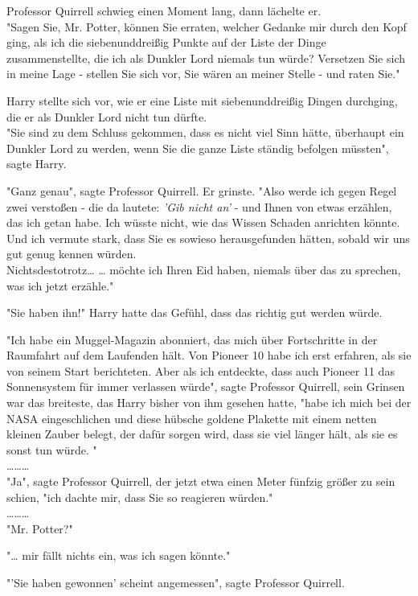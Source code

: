 {Professor Quirrell schwieg einen Moment lang, dann lächelte er.\\ "Sagen Sie, Mr. Potter, können Sie erraten, welcher Gedanke mir durch den Kopf ging, als ich die siebenunddreißig Punkte auf der Liste der Dinge zusammenstellte, die ich als Dunkler Lord niemals tun würde? Versetzen Sie sich in meine Lage - stellen Sie sich vor, Sie wären an meiner Stelle - und raten Sie."

Harry stellte sich vor, wie er eine Liste mit siebenunddreißig Dingen durchging, die er als Dunkler Lord nicht tun dürfte.\\ "Sie sind zu dem Schluss gekommen, dass es nicht viel Sinn hätte, überhaupt ein Dunkler Lord zu werden, wenn Sie die ganze Liste ständig befolgen müssten", sagte Harry.

"Ganz genau", sagte Professor Quirrell. Er grinste. "Also werde ich gegen Regel zwei verstoßen - die da lautete: \emph{'Gib nicht an'} - und Ihnen von etwas erzählen, das ich getan habe. Ich wüsste nicht, wie das Wissen Schaden anrichten könnte. Und ich vermute stark, dass Sie es sowieso herausgefunden hätten, sobald wir uns gut genug kennen würden.\\ Nichtsdestotrotz… … möchte ich Ihren Eid haben, niemals über das zu sprechen, was ich jetzt erzähle."

"Sie haben ihn!" Harry hatte das Gefühl, dass das richtig gut werden würde.

"Ich habe ein Muggel-Magazin abonniert, das mich über Fortschritte in der Raumfahrt auf dem Laufenden hält. Von Pioneer 10 habe ich erst erfahren, als sie von seinem Start berichteten. Aber als ich entdeckte, dass auch Pioneer 11 das Sonnensystem für immer verlassen würde", sagte Professor Quirrell, sein Grinsen war das breiteste, das Harry bisher von ihm gesehen hatte, "habe ich mich bei der NASA eingeschlichen und diese hübsche goldene Plakette mit einem netten kleinen Zauber belegt, der dafür sorgen wird, dass sie viel länger hält, als sie es sonst tun würde. "\\ ………\\ "Ja", sagte Professor Quirrell, der jetzt etwa einen Meter fünfzig größer zu sein schien, "ich dachte mir, dass Sie so reagieren würden."\\ ………\\ "Mr. Potter?"

"… mir fällt nichts ein, was ich sagen könnte."

"'Sie haben gewonnen' scheint angemessen", sagte Professor Quirrell.

}
